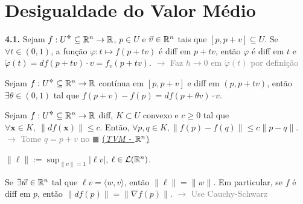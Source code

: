 \section{Desigualdade do Valor Médio} 

\hypertarget{lemma41}{}
\begin{lemma}
    \textbf{4.1.} Sejam \(f:U\ab\subseteq \R^n \to \R \), \(p\in U\) e \(\vec{v} \in \mathbb{R}^n\) tais que \([p,p+v]\subseteq U\). Se \(\forall t \in (0,1)\), a função \(\varphi : t \mapsto f(p+tv)\) é diff em \(p+tv\), então \(\varphi\) é diff em \(t\) e \(\dot{\varphi} (t) = df(p+tv)\cdot v=  f_v (p+tv)\). \textcolor{gray}{\(\rightarrow \) Faz \(h\to 0\) em \(\dot{\varphi}(t)\) por definição}
\end{lemma}

\hypertarget{thmTVMRn}{}
\begin{theorem}
    Sejam \(f:U\ab\subseteq \R^n\to \R\) contínua em \([p,p+v]\) e diff em \((p, p+tv)\), então \(\exists\theta \in (0,1)\) tal que \(f(p+v)-f(p)= df(p+\theta v )\cdot v \). 
\end{theorem} 

\hypertarget{corDVMRn}{}
\begin{corollary}
     Sejam \(f: U\ab\subseteq \R^n \to \R\) diff, \(K\subset U\) convexo e \( c\geq 0 \) tal que \(\forall \textbf{x}\in K, \ \|df(\textbf{x})\|\leq c\). Então, \(\forall p,q\in K, \|f(p)-f(q)\|\leq c \|p-q\|\). \textcolor{gray}{\(\rightarrow\) Tome \(q = p+v\) no \(\blacksquare\) \hyperlink{thmTVMRn}{(\emph{TVM - \(\mathbb{R}^n\)})}} 
\end{corollary}

\newcommand{\Li}{\mathcal{L}}
\begin{definition}
    \centering \(\displaystyle \|\ell \| := \sup_{\|v\|=1} |\ell v |\), \(\ell\in \mathcal{L}(\mathbb{R}^n)\).  
\end{definition}

\begin{exercise}
    Se \(\exists \vec{w}\in \mathbb{R}^n\) tal que \(\ell v = \langle w, v \rangle \), então \(\|\ell\| = \|w\|\). Em particular, se \(f\) é diff em \(p\), então \(\|df(p)\|= \|\nabla f (p)\|\). \textcolor{gray}{\(\rightarrow \) Use Cauchy-Schwarz} %
\end{exercise}

